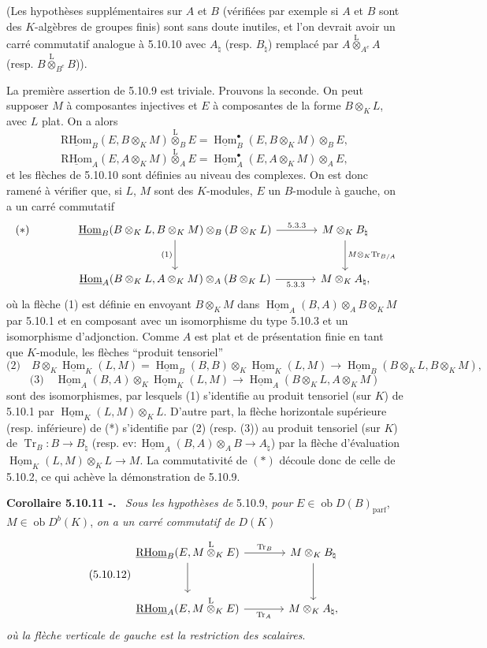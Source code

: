 \documentclass[11pt]{article}
\newenvironment{statement}[1]{\par\medskip\noindent\textbf{#1.}\ }{\par\medskip}
\DeclareMathOperator{\Hom}{Hom}
\newcommand{\R}{\mathrm{R}}\newcommand{\RHomCore}{\mathrm{RHom}}
\newcommand{\ob}{\operatorname{ob}}
\providecommand{\RHom}{\RHomCore}
\providecommand{\uRHom}{\underline{\RHom}}
\providecommand{\uHom}{\underline{\Hom}}
\providecommand{\Tr}{\operatorname{Tr}}
\providecommand{\Tr}{\operatorname{Tr}}
\providecommand{\lten}{\overset{\mathrm L}{\otimes}}
\providecommand{\Tr}{\operatorname{Tr}}
\providecommand{\RHom}{\RHomCore}
\providecommand{\Hom}{\operatorname{Hom}}
\providecommand{\ob}{\operatorname{ob}}
\providecommand{\lten}{\overset{\mathrm L}{\otimes}}
\providecommand{\RHom}{\R\mathcal{H}om}
\providecommand{\lten}{\overset{\mathrm L}{\otimes}}
\providecommand{\R}{\mathrm R}
\providecommand{\Tr}{\operatorname{Tr}}
\providecommand{\lten}{\overset{\mathrm L}{\otimes}}
\providecommand{\lten}{\overset{\mathrm L}{\otimes}}
\providecommand{\lten}{\overset{\mathrm L}{\otimes}}
\providecommand{\RHom}{\RHomCore}
\providecommand{\Hom}{\operatorname{Hom}}
\providecommand{\Tr}{\operatorname{Tr}}
\providecommand{\lten}{\overset{\mathrm L}{\otimes}}
\begin{document}
(Les hypothèses supplémentaires sur $A$ et $B$ (vérifiées par exemple si $A$ et $B$ sont des $K$-algèbres de groupes finis) sont sans doute inutiles, et l'on devrait avoir un carré commutatif analogue à 5.10.10 avec $A_\natural$ (resp. $B_\natural$) remplacé par $A\lten_{A^e}A$ (resp. $B\lten_{B^e}B$)).

La première assertion de 5.10.9 est triviale. Prouvons la seconde. On peut supposer $M$ à composantes injectives et $E$ à composantes de la forme $B\otimes_KL$, avec $L$ plat. On a alors
\[
\uRHom_B(E,B\otimes_KM)\lten_BE=\uHom_B^\bullet(E,B\otimes_KM)\otimes_BE,
\]
\[
\uRHom_A(E,A\otimes_KM)\lten_AE=\uHom_A^\bullet(E,A\otimes_KM)\otimes_AE,
\]
et les flèches de 5.10.10 sont définies au niveau des complexes. On est donc ramené à vérifier que, si $L$, $M$ sont des $K$-modules, $E$ un $B$-module à gauche, on a un carré commutatif
\[
\begin{tikzcd}[column sep=large,row sep=large]
|[alias=star]| {(*)} & \uHom_B(B\otimes_KL,B\otimes_KM)\otimes_B(B\otimes_KL) \arrow[r,"5.3.3"] \arrow[d,"(1)"'] & M\otimes_KB_\natural \arrow[d,"M\otimes_K\Tr_{B/A}"]\\
& \uHom_A(B\otimes_KL,A\otimes_KM)\otimes_A(B\otimes_KL) \arrow[r,"5.3.3"'] & M\otimes_KA_\natural,
\end{tikzcd}
\]
où la flèche (1) est définie en envoyant $B\otimes_KM$ dans $\uHom_A(B,A)\otimes_AB\otimes_KM$ par 5.10.1 et en composant avec un isomorphisme du type 5.10.3 et un isomorphisme d'adjonction. Comme $A$ est plat et de présentation finie en tant que $K$-module, les flèches ``produit tensoriel''
\[
\text{(2)}\quad B\otimes_K\uHom_K(L,M)=\uHom_B(B,B)\otimes_K\uHom_K(L,M)\to\uHom_B(B\otimes_KL,B\otimes_KM),
\]
\[
\text{(3)}\quad \uHom_A(B,A)\otimes_K\uHom_K(L,M)\to\uHom_A(B\otimes_KL,A\otimes_KM)
\]
sont des isomorphismes, par lesquels (1) s'identifie au produit tensoriel (sur $K$) de 5.10.1 par $\uHom_K(L,M)\otimes_KL$. D'autre part, la flèche horizontale supérieure (resp. inférieure) de (*) s'identifie par (2) (resp. (3)) au produit tensoriel (sur $K$)
de $\Tr_B:B\to B_\natural$ (resp. $\mathrm{ev}:\uHom_A(B,A)\otimes_AB\to A_\natural$) par la flèche d'évaluation $\uHom_K(L,M)\otimes_KL\to M$. La commutativité de $(*)$ découle donc de celle de 5.10.2, ce qui achève la démonstration de 5.10.9.

\begin{statement}{Corollaire 5.10.11 -}
\emph{Sous les hypothèses de} 5.10.9, \emph{pour} $E\in\ob D(B)_{\mathrm{parf}}$, $M\in\ob D^b(K)$, \emph{on a un carré commutatif de} $D(K)$
\begin{equation}\tag{5.10.12}
\begin{tikzcd}[column sep=large,row sep=large]
\uRHom_B(E,M\lten_KE) \arrow[r,"\Tr_B"] \arrow[d] & M\otimes_KB_\natural \arrow[d]\\
\uRHom_A(E,M\lten_KE) \arrow[r,"\Tr_A"'] & M\otimes_KA_\natural,
\end{tikzcd}
\end{equation}
\emph{où la flèche verticale de gauche est la restriction des scalaires}.
\end{statement}
\end{document}
